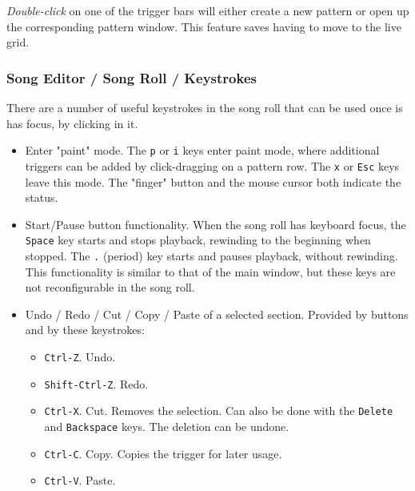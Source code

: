    \textsl{Double-click} on one of the trigger bars
   will either create a new pattern or open up the corresponding pattern
   window.
   This feature saves having to move to the live grid.

\subsubsection{Song Editor / Song Roll / Keystrokes}
\label{subsubsec:song_editor_song_roll_keystrokes}

   There are a number of useful keystrokes in the song roll that can be used
   once is has focus, by clicking in it.

   \begin{itemize}
      \item Enter "paint" mode.
         The \texttt{p} or \texttt{i} keys enter paint mode,
         where additional triggers
         can be added by click-dragging on a pattern row.
         The \texttt{x} or \texttt{Esc} keys leave this mode.
         The "finger" button and the mouse cursor both indicate the status.
      \item Start/Pause button functionality.
         When the song roll has keyboard focus,
         the \texttt{Space} key starts and stops playback, rewinding to the
         beginning when stopped.
         The \texttt{.} (period) key starts and pauses playback, without
         rewinding.
         This functionality is similar to that of the main window, but
         these keys are not reconfigurable in the song roll.
      \item Undo / Redo / Cut / Copy / Paste of a selected section.
         Provided by buttons and by these keystrokes:
         \begin{itemize}
            \item \texttt{Ctrl-Z}. Undo.
            \item \texttt{Shift-Ctrl-Z}. Redo.
            \item \texttt{Ctrl-X}. Cut.  Removes the selection.
            Can also be done with the \texttt{Delete} and
            \texttt{Backspace} keys.
            The deletion can be undone.
            \item \texttt{Ctrl-C}. Copy.
            Copies the trigger for later usage.
            \item \texttt{Ctrl-V}. Paste.

\end{itemize}
\end{itemize}
